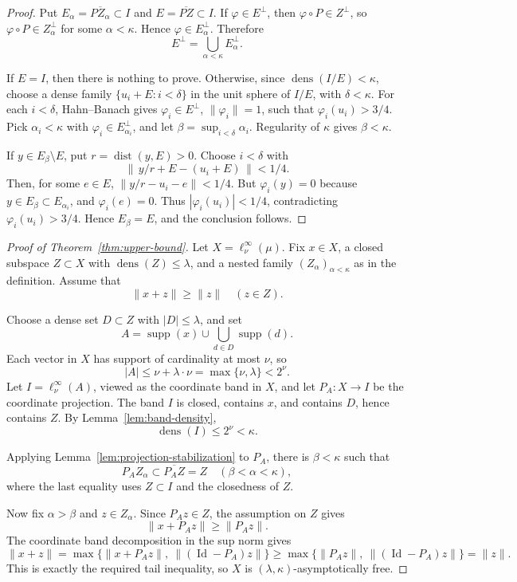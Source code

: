 \documentclass[11pt]{article}
\newcommand{\dens}{\operatorname{dens}}
\newcommand{\supp}{\operatorname{supp}}
\newcommand{\dist}{\operatorname{dist}}
\newcommand{\Id}{\operatorname{Id}}
\begin{document}
\begin{proof}
Put \(E_\alpha=\overline{PZ_\alpha}\subset I\) and
\(E=\overline{PZ}\subset I\).  If \(\varphi\in E^\perp\), then
\(\varphi\circ P\in Z^\perp\), so \(\varphi\circ P\in Z_\alpha^\perp\) for
some \(\alpha<\kappa\).  Hence \(\varphi\in E_\alpha^\perp\).  Therefore
\[
  E^\perp=\bigcup_{\alpha<\kappa} E_\alpha^\perp .
\]

If \(E=I\), then there is nothing to prove.  Otherwise, since
\(\dens(I/E)<\kappa\), choose a dense family
\(\{u_i+E:i<\delta\}\) in the unit sphere of \(I/E\), with
\(\delta<\kappa\).  For each \(i<\delta\), Hahn--Banach gives
\(\varphi_i\in E^\perp\), \(\|\varphi_i\|=1\), such that
\(\varphi_i(u_i)>3/4\).  Pick \(\alpha_i<\kappa\) with
\(\varphi_i\in E_{\alpha_i}^\perp\), and let
\(\beta=\sup_{i<\delta}\alpha_i\).  Regularity of \(\kappa\) gives
\(\beta<\kappa\).

If \(y\in E_\beta\setminus E\), put \(r=\dist(y,E)>0\).  Choose \(i<\delta\)
with
\[
  \left\|\,y/r+E-(u_i+E)\,\right\|<1/4 .
\]
Then, for some \(e\in E\), \(\|y/r-u_i-e\|<1/4\).  But
\(\varphi_i(y)=0\) because \(y\in E_\beta\subset E_{\alpha_i}\), and
\(\varphi_i(e)=0\).  Thus \(|\varphi_i(u_i)|<1/4\), contradicting
\(\varphi_i(u_i)>3/4\).  Hence \(E_\beta=E\), and the conclusion follows.
\end{proof}

\begin{proof}[Proof of Theorem~\ref{thm:upper-bound}]
Let \(X=\ell_\nu^\infty(\mu)\).  Fix \(x\in X\), a closed subspace
\(Z\subset X\) with \(\dens(Z)\leq\lambda\), and a nested family
\((Z_\alpha)_{\alpha<\kappa}\) as in the definition.  Assume that
\[
  \|x+z\|\geq\|z\|\quad(z\in Z).
\]

Choose a dense set \(D\subset Z\) with \(|D|\leq\lambda\), and set
\[
  A=\supp(x)\cup\bigcup_{d\in D}\supp(d).
\]
Each vector in \(X\) has support of cardinality at most \(\nu\), so
\[
  |A|\leq \nu+\lambda\cdot\nu=\max\{\nu,\lambda\}<2^\nu .
\]
Let \(I=\ell_\nu^\infty(A)\), viewed as the coordinate band in \(X\), and let
\(P_A:X\to I\) be the coordinate projection.  The band \(I\) is closed,
contains \(x\), and contains \(D\), hence contains \(Z\).  By
Lemma~\ref{lem:band-density},
\[
  \dens(I)\leq 2^\nu<\kappa .
\]

Applying Lemma~\ref{lem:projection-stabilization} to \(P_A\), there is
\(\beta<\kappa\) such that
\[
  P_AZ_\alpha\subset \overline{P_AZ}=Z
  \quad(\beta<\alpha<\kappa),
\]
where the last equality uses \(Z\subset I\) and the closedness of \(Z\).

Now fix \(\alpha>\beta\) and \(z\in Z_\alpha\).  Since \(P_Az\in Z\), the
assumption on \(Z\) gives
\[
  \|x+P_Az\|\geq\|P_Az\|.
\]
The coordinate band decomposition in the sup norm gives
\[
  \|x+z\|
  =\max\{\|x+P_Az\|,\ \|(\Id-P_A)z\|\}
  \geq \max\{\|P_Az\|,\ \|(\Id-P_A)z\|\}
  =\|z\|.
\]
This is exactly the required tail inequality, so \(X\) is
\((\lambda,\kappa)\)-asymptotically free.
\end{proof}
\end{document}

